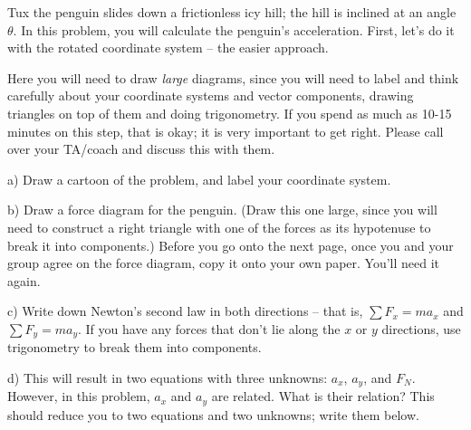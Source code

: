 \documentclass[12pt]{article}
\begin{document}
\newpage




Tux the penguin slides down a frictionless icy hill; the hill is inclined at an angle $\theta$. In this problem, you will 
calculate the penguin's acceleration. First, let's do it with the rotated coordinate system -- the easier approach.

Here you will need to draw {\it large} diagrams, since you will need to label and think carefully about your coordinate systems and vector components, drawing triangles on top of them and doing trigonometry. If you spend as much as 10-15 minutes on this step, that is okay; it is very important to get right. Please call over your TA/coach and discuss this with them.



\bigskip

\begin{minipage}{0.4\textwidth}
\begin{center}a) Draw a cartoon of the problem, and label your coordinate system.
\end{center}
\end{minipage}
\hspace{0.05\textwidth}
\begin{minipage}{0.55\textwidth}

	b) Draw a force diagram for the penguin. (Draw this one large, since you will need to construct a right triangle with one of the forces as its hypotenuse to break it into components.) Before you go onto the next page, once you and your group agree on the force diagram, copy it onto your own paper. You'll need it again.


\end{minipage}
\vspace{2in}


\newpage

c) Write down Newton's second law in both directions -- that is, $\sum F_x = ma_x$ and $\sum F_y = ma_y$. If you have any forces that don't lie along the $x$ or $y$ directions, use trigonometry to break them into components.

\vspace{1.7in}

d) This will result in two equations with three unknowns: $a_x$, $a_y$, and $F_N$. However, in this problem, $a_x$ and $a_y$ are related. What is their relation? This should reduce you to two equations and two unknowns; write them below.
\vspace{1.7in}
\end{document}
